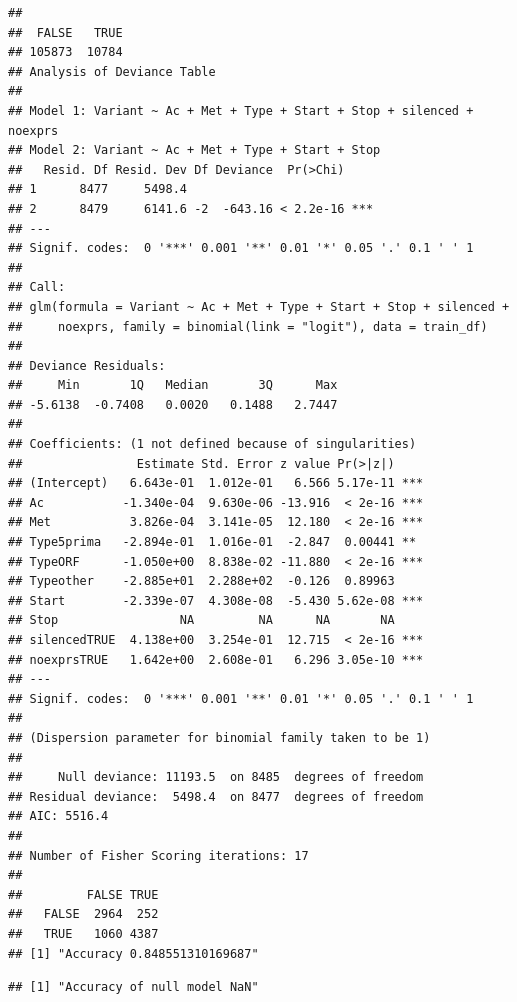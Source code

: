 \documentclass{article}\usepackage[]{graphicx}\usepackage[]{color}
\makeatletter
\newenvironment{kframe}{%
 \def\at@end@of@kframe{}%
 \ifinner\ifhmode%
  \def\at@end@of@kframe{\end{minipage}}%
  \begin{minipage}{\columnwidth}%
 \fi\fi%
 \def\FrameCommand##1{\hskip\@totalleftmargin \hskip-\fboxsep
 \colorbox{shadecolor}{##1}\hskip-\fboxsep
     \hskip-\linewidth \hskip-\@totalleftmargin \hskip\columnwidth}%
 \MakeFramed {\advance\hsize-\width
   \@totalleftmargin\z@ \linewidth\hsize
   \@setminipage}}%
 {\par\unskip\endMakeFramed%
 \at@end@of@kframe}
\newenvironment{knitrout}{}{} %
\makeatother
\begin{document}
\begin{knitrout}
\color{fgcolor}\begin{kframe}
\begin{verbatim}
## 
##  FALSE   TRUE 
## 105873  10784
## Analysis of Deviance Table
## 
## Model 1: Variant ~ Ac + Met + Type + Start + Stop + silenced + noexprs
## Model 2: Variant ~ Ac + Met + Type + Start + Stop
##   Resid. Df Resid. Dev Df Deviance  Pr(>Chi)    
## 1      8477     5498.4                          
## 2      8479     6141.6 -2  -643.16 < 2.2e-16 ***
## ---
## Signif. codes:  0 '***' 0.001 '**' 0.01 '*' 0.05 '.' 0.1 ' ' 1
## 
## Call:
## glm(formula = Variant ~ Ac + Met + Type + Start + Stop + silenced + 
##     noexprs, family = binomial(link = "logit"), data = train_df)
## 
## Deviance Residuals: 
##     Min       1Q   Median       3Q      Max  
## -5.6138  -0.7408   0.0020   0.1488   2.7447  
## 
## Coefficients: (1 not defined because of singularities)
##                Estimate Std. Error z value Pr(>|z|)    
## (Intercept)   6.643e-01  1.012e-01   6.566 5.17e-11 ***
## Ac           -1.340e-04  9.630e-06 -13.916  < 2e-16 ***
## Met           3.826e-04  3.141e-05  12.180  < 2e-16 ***
## Type5prima   -2.894e-01  1.016e-01  -2.847  0.00441 ** 
## TypeORF      -1.050e+00  8.838e-02 -11.880  < 2e-16 ***
## Typeother    -2.885e+01  2.288e+02  -0.126  0.89963    
## Start        -2.339e-07  4.308e-08  -5.430 5.62e-08 ***
## Stop                 NA         NA      NA       NA    
## silencedTRUE  4.138e+00  3.254e-01  12.715  < 2e-16 ***
## noexprsTRUE   1.642e+00  2.608e-01   6.296 3.05e-10 ***
## ---
## Signif. codes:  0 '***' 0.001 '**' 0.01 '*' 0.05 '.' 0.1 ' ' 1
## 
## (Dispersion parameter for binomial family taken to be 1)
## 
##     Null deviance: 11193.5  on 8485  degrees of freedom
## Residual deviance:  5498.4  on 8477  degrees of freedom
## AIC: 5516.4
## 
## Number of Fisher Scoring iterations: 17
##        
##         FALSE TRUE
##   FALSE  2964  252
##   TRUE   1060 4387
## [1] "Accuracy 0.848551310169687"
\end{verbatim}


{\ttfamily\noindent\bfseries\color{errorcolor}{\#\# Error in `[<-.data.frame`(`*tmp*`, "{}all\_0.5"{}, value = c(0, 1, 1, 0, 0, : replacement has 8845 rows, data has 8663}}\begin{verbatim}
## [1] "Accuracy of null model NaN"
\end{verbatim}


{\ttfamily\noindent\itshape\color{messagecolor}{\#\# Loading required package: gplots}}


\end{kframe}
\end{knitrout}
\end{document}
